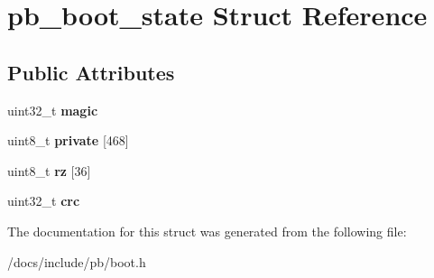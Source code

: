 \hypertarget{structpb__boot__state}{}\section{pb\+\_\+boot\+\_\+state Struct Reference}
\label{structpb__boot__state}
\subsection*{Public Attributes}
\begin{DoxyCompactItemize}
\item 
\mbox{\label{structpb__boot__state_a48fd3a69632338febecf0adbcbd04c99}} 
uint32\+\_\+t {\bfseries magic}
\item 
\mbox{\label{structpb__boot__state_ad6945c69453eaa110db04a99703686c2}} 
uint8\+\_\+t {\bfseries private} \mbox{[}468\mbox{]}
\item 
\mbox{\label{structpb__boot__state_af2112908c164339cc2961082c639e8ff}} 
uint8\+\_\+t {\bfseries rz} \mbox{[}36\mbox{]}
\item 
\mbox{\label{structpb__boot__state_a26ce9406ae1b395781a06108d5e5c50c}} 
uint32\+\_\+t {\bfseries crc}
\end{DoxyCompactItemize}


The documentation for this struct was generated from the following file\+:\begin{DoxyCompactItemize}
\item 
/docs/include/pb/boot.\+h\end{DoxyCompactItemize}
